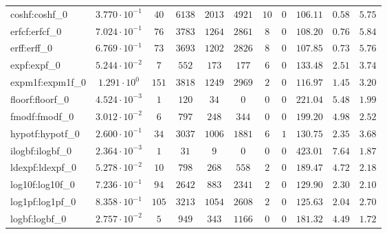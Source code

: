 \begin{tabular}{|l|c|c|c|c|c|c|c|c|c|c|}
coshf:coshf\_0               & $ 3.770 \cdot 10^{-1} $ & $ 40     $ & $ 6138   $ & $ 2013  $ & $ 4921  $ & $ 10  $ & $ 0 $ & $ 106.11      $ & $ 0.58    $ & $ 5.75    $ \\
erfcf:erfcf\_0               & $ 7.024 \cdot 10^{-1} $ & $ 76     $ & $ 3783   $ & $ 1264  $ & $ 2861  $ & $ 8   $ & $ 0 $ & $ 108.20      $ & $ 0.76    $ & $ 5.84    $ \\
erff:erff\_0                 & $ 6.769 \cdot 10^{-1} $ & $ 73     $ & $ 3693   $ & $ 1202  $ & $ 2826  $ & $ 8   $ & $ 0 $ & $ 107.85      $ & $ 0.73    $ & $ 5.76    $ \\
expf:expf\_0                 & $ 5.244 \cdot 10^{-2} $ & $ 7      $ & $ 552    $ & $ 173   $ & $ 177   $ & $ 6   $ & $ 0 $ & $ 133.48      $ & $ 2.51    $ & $ 3.74    $ \\
expm1f:expm1f\_0             & $ 1.291 \cdot 10^{0}  $ & $ 151    $ & $ 3818   $ & $ 1249  $ & $ 2969  $ & $ 2   $ & $ 0 $ & $ 116.97      $ & $ 1.45    $ & $ 3.20    $ \\
floorf:floorf\_0             & $ 4.524 \cdot 10^{-3} $ & $ 1      $ & $ 120    $ & $ 34    $ & $ 0     $ & $ 0   $ & $ 0 $ & $ 221.04      $ & $ 5.48    $ & $ 1.99    $ \\
fmodf:fmodf\_0               & $ 3.012 \cdot 10^{-2} $ & $ 6      $ & $ 797    $ & $ 248   $ & $ 344   $ & $ 0   $ & $ 0 $ & $ 199.20      $ & $ 4.98    $ & $ 2.52    $ \\
hypotf:hypotf\_0             & $ 2.600 \cdot 10^{-1} $ & $ 34     $ & $ 3037   $ & $ 1006  $ & $ 1881  $ & $ 6   $ & $ 1 $ & $ 130.75      $ & $ 2.35    $ & $ 3.68    $ \\
ilogbf:ilogbf\_0             & $ 2.364 \cdot 10^{-3} $ & $ 1      $ & $ 31     $ & $ 9     $ & $ 0     $ & $ 0   $ & $ 0 $ & $ 423.01      $ & $ 7.64    $ & $ 1.87    $ \\
ldexpf:ldexpf\_0             & $ 5.278 \cdot 10^{-2} $ & $ 10     $ & $ 798    $ & $ 268   $ & $ 558   $ & $ 2   $ & $ 0 $ & $ 189.47      $ & $ 4.72    $ & $ 2.18    $ \\
log10f:log10f\_0             & $ 7.236 \cdot 10^{-1} $ & $ 94     $ & $ 2642   $ & $ 883   $ & $ 2341  $ & $ 2   $ & $ 0 $ & $ 129.90      $ & $ 2.30    $ & $ 2.10    $ \\
log1pf:log1pf\_0             & $ 8.358 \cdot 10^{-1} $ & $ 105    $ & $ 3213   $ & $ 1054  $ & $ 2608  $ & $ 2   $ & $ 0 $ & $ 125.63      $ & $ 2.04    $ & $ 2.70    $ \\
logbf:logbf\_0               & $ 2.757 \cdot 10^{-2} $ & $ 5      $ & $ 949    $ & $ 343   $ & $ 1166  $ & $ 0   $ & $ 0 $ & $ 181.32      $ & $ 4.49    $ & $ 1.72    $ \\

\end{tabular}
